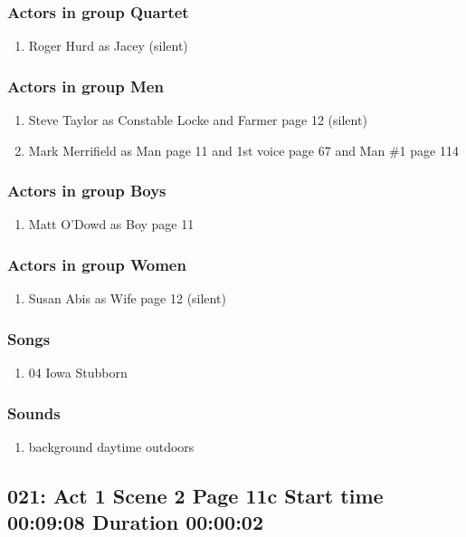 \subsubsection{Actors in group Quartet}
\begin{enumerate}
\item Roger Hurd as Jacey (silent)
\end{enumerate}
\subsubsection{Actors in group Men}
\begin{enumerate}
\item Steve Taylor as Constable Locke and Farmer page 12 (silent)
\item Mark Merrifield as Man page 11 and 1st voice page 67 and Man \#1 page 114
\end{enumerate}
\subsubsection{Actors in group Boys}
\begin{enumerate}
\item Matt O'Dowd as Boy page 11
\end{enumerate}
\subsubsection{Actors in group Women}
\begin{enumerate}
\item Susan Abis as Wife page 12 (silent)
\end{enumerate}

\subsubsection{Songs}
\begin{enumerate}
\item 04 Iowa Stubborn
\end{enumerate}\subsubsection{Sounds}
\begin{enumerate}
\item background daytime outdoors
\end{enumerate}
\subsection{021: Act 1 Scene 2 Page 11c Start time 00:09:08 Duration 00:00:02}

